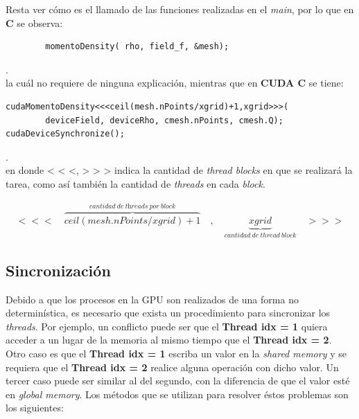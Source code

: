 Resta ver cómo es el llamado de las funciones realizadas en el \textit{main}, por lo que en \textbf{C} se observa:


{\footnotesize
	\begin{frame}{}
		\begin{lstlisting}
		momentoDensity( rho, field_f, &mesh);
		\end{lstlisting}
		
	\end{frame}
}.
\\
la cuál no requiere de ninguna explicación, mientras que en \textbf{CUDA C} se tiene:

{\footnotesize
	\begin{frame}{}
		\begin{lstlisting}
cudaMomentoDensity<<<ceil(mesh.nPoints/xgrid)+1,xgrid>>>(
 		deviceField, deviceRho, cmesh.nPoints, cmesh.Q);  
cudaDeviceSynchronize();

		\end{lstlisting}
		
	\end{frame}
}.
\\
en donde < < <, > > > indica la cantidad de \textit{thread blocks} en que se realizará la tarea, como así también la cantidad de \textit{threads} en cada \textit{block}.

\begin{align*}
		<<<\quad \overbrace{ceil(mesh.nPoints/xgrid)+1}^{cantidad \>de\> \textit{threads}\> por\> \textit{block}}\quad,\quad \underbrace{xgrid}_{cantidad\>de\>thread\>block} \quad>>>
\end{align*}

\subsection{Sincronización}

Debido a que los procesos en la GPU son realizados de una forma no determinística, es necesario que exista un procedimiento para sincronizar los \textit{threads}. Por ejemplo, un conflicto puede ser que el \textbf{Thread idx = 1} quiera acceder a un lugar de la memoria al mismo tiempo que el \textbf{Thread idx = 2}. Otro caso es que el \textbf{Thread idx = 1} escriba un valor en la \textit{shared memory} y se requiera que el \textbf{Thread idx = 2} realice alguna operación con dicho valor. Un tercer caso puede ser similar al del segundo, con la diferencia de que el valor esté en \textit{global memory}. Los métodos que se utilizan para resolver éstos problemas son los siguientes:

